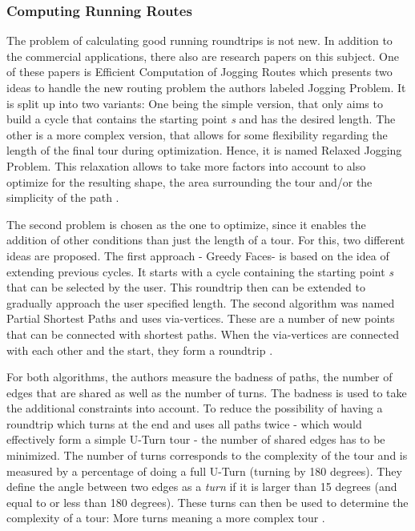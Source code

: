 \subsubsection{Computing Running Routes}
\label{subsubsec:runningRoutes}

The problem of calculating good running roundtrips is not new.
In addition to the commercial applications, there also are research papers on this subject.
One of these papers is \glqq Efficient Computation of Jogging Routes\grqq \cite{gemsa_efficient_2013} which presents two ideas to handle the new routing problem the authors labeled \glqq Jogging Problem\grqq .
It is split up into two variants: 
One being the simple version, that only aims to build a cycle that contains the starting point \textit{s} and has the desired length.
The other is a more complex version, that allows for some flexibility regarding the length of the final tour during optimization. 
Hence, it is named \glqq Relaxed Jogging Problem\grqq . 
This relaxation allows to take more factors into account to also optimize for the resulting shape, the area surrounding the tour and/or the simplicity of the path \cite{gemsa_efficient_2013}. 

The second problem is chosen as the one to optimize, since it enables the addition of other conditions than just the length of a tour.
For this, two different ideas are proposed.
The first approach - \glqq Greedy Faces\grqq - is based on the idea of extending previous cycles.
It starts with a cycle containing the starting point \textit{s} that can be selected by the user. 
This roundtrip then can be extended to gradually approach the user specified length. 
The second algorithm was named \glqq Partial Shortest Paths\grqq{} and uses via-vertices.
These are a number of new points that can be connected with shortest paths.
When the via-vertices are connected with each other and the start, they form a roundtrip \cite{gemsa_efficient_2013}.


For both algorithms, the authors measure the badness of paths, the number of edges that are shared as well as the number of turns.
The badness is used to take the additional constraints into account. 
To reduce the possibility of having a roundtrip which turns at the end and uses all paths twice - which would effectively form a simple U-Turn tour - the number of shared edges has to be minimized.
The number of turns corresponds to the complexity of the tour and is measured by a percentage of doing a full U-Turn (turning by 180 degrees). 
They define the angle between two edges as a \textit{turn} if it is larger than 15 degrees (and equal to or less than 180 degrees).
These turns can then be used to determine the complexity of a tour:
More turns meaning a more complex tour \cite{gemsa_efficient_2013}.

